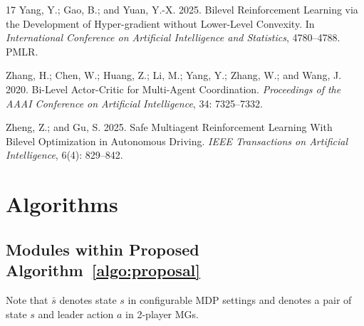 \documentclass[letterpaper]{article} %
\begin{document}
\begin{thebibliography}{17}
Yang, Y.; Gao, B.; and Yuan, Y.-X. 2025.
\newblock Bilevel Reinforcement Learning via the Development of Hyper-gradient without Lower-Level Convexity.
\newblock In \emph{International Conference on Artificial Intelligence and Statistics}, 4780--4788. PMLR.

Zhang, H.; Chen, W.; Huang, Z.; Li, M.; Yang, Y.; Zhang, W.; and Wang, J. 2020.
\newblock Bi-Level Actor-Critic for Multi-Agent Coordination.
\newblock \emph{Proceedings of the AAAI Conference on Artificial Intelligence}, 34: 7325--7332.

Zheng, Z.; and Gu, S. 2025.
\newblock Safe Multiagent Reinforcement Learning With Bilevel Optimization in Autonomous Driving.
\newblock \emph{IEEE Transactions on Artificial Intelligence}, 6(4): 829--842.

\end{thebibliography}

% 



\appendix

\onecolumn

\section{Algorithms}

\subsection{Modules within Proposed Algorithm~\ref{algo:proposal}}

Note that $\bar{s}$ denotes state $s$ in configurable MDP settings and denotes a pair of state $s$ and leader action $a$ in 2-player MGs.

\begin{algorithm}[H]
\caption{$\texttt{CriticUpdate}(Q_L^i,B)$ (with SARSA)}
\label{algo:critic_update_sarsa}
\begin{algorithmic}[1]
\ENDFOR
{}
\end{algorithmic}
\end{algorithm}
\end{document}
